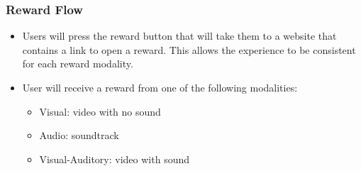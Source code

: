 \subsubsection{Reward Flow} \label{reward_flow}


\begin{itemize}
  \item Users will press the reward button that will take them to a website that contains a link to open a reward. This allows the experience to be consistent for each reward modality.
  \item User will receive a reward from one of the following modalities:
  \begin{itemize}
    \item Visual: video with no sound
    \item Audio: soundtrack
    \item Visual-Auditory: video with sound
  \end{itemize}
\end{itemize}

